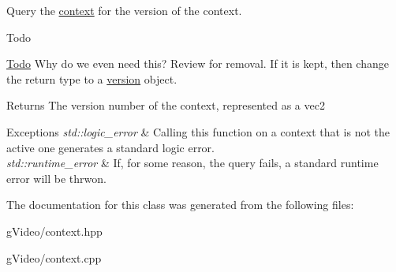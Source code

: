 Query the \hyperlink{classgfx_1_1context}{context} for the version of the context. 

\begin{DoxyRefDesc}{Todo}
\item[\hyperlink{todo__todo000005}{Todo}]Why do we even need this? Review for removal. If it is kept, then change the return type to a \hyperlink{classgfx_1_1version}{version} object. \begin{DoxyReturn}{Returns}
The version number of the context, represented as a vec2 
\end{DoxyReturn}

\begin{DoxyExceptions}{Exceptions}
{\em std\-::logic\-\_\-error} & Calling this function on a context that is not the active one generates a standard logic error. \\
\hline
{\em std\-::runtime\-\_\-error} & If, for some reason, the query fails, a standard runtime error will be thrwon. \\
\hline
\end{DoxyExceptions}
\end{DoxyRefDesc}


The documentation for this class was generated from the following files\-:\begin{DoxyCompactItemize}
\item 
g\-Video/context.\-hpp\item 
g\-Video/context.\-cpp\end{DoxyCompactItemize}
